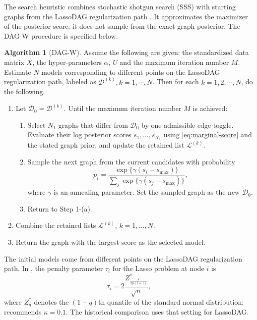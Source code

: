 \documentclass[12pt]{article}
\theoremstyle{plain}
\theoremstyle{definition}
\newtheorem{algo}[theorem]{Algorithm}
\theoremstyle{remark}
\begin{document}
The search heuristic combines stochastic shotgun search (SSS)
\cite{SSS} with starting graphs from the LassoDAG regularization path
\cite{LassoDAG}.  It approximates the maximizer of the posterior score;
it does not sample from the exact graph posterior.  The DAG-W procedure
is specified below.
\begin{algo}[DAG-W]\label{algo:DAG-W}
Assume the following are given: the standardized data matrix $X$, the hyper-parameters $\alpha$, $U$ and the maximum iteration number $M$. Estimate  $N$ models corresponding to different points on the LassoDAG regularization path, labeled as $\mathcal{D}^{(k)}, k=1, \cdots, N$. Then for each $k = 1, 2, \cdots, N$, do the following.
\begin{enumerate}
\item Let $\mathcal{D}_0 = \mathcal{D}^{(k)}$. Until the maximum iteration number $M$ is achieved:
\begin{enumerate}
\item Select $N_1$ graphs that differ from $\mathcal{D}_0$ by one
admissible edge toggle.  Evaluate their log posterior scores
$s_1,\ldots,s_{N_1}$ using \eqref{eq:marginal-score} and the stated
graph prior, and update the retained list $\mathcal{L}^{(k)}$.
\item Sample the next graph from the current candidates with probability
\[
p_i=\frac{\exp\{\gamma(s_i-s_{\max})\}}
{\sum_j\exp\{\gamma(s_j-s_{\max})\}},
\]
where $\gamma$ is an annealing parameter.  Set the sampled graph as the
new $\mathcal{D}_0$.
\item Return to Step 1-(a).
\end{enumerate}
\item Combine the retained lists \(\mathcal{L}^{(k)}\), \(k=1,\ldots,N\).
\item Return the graph with the largest score as the selected model.
\end{enumerate}
\end{algo}

The initial models come from different points on the LassoDAG
regularization path.  In \cite{LassoDAG}, the penalty parameter
\(\tau_i\) for the Lasso problem at node \(i\) is
\begin{equation}
\label{eq:eq1}
\tau_i = 2\frac{Z^*_{\frac{\kappa}{2p(i-1)}}}{\sqrt{n}},
\end{equation}
where \(Z^*_q\) denotes the \((1-q)\)th quantile of the standard normal
distribution; \cite{LassoDAG} recommends \(\kappa=0.1\).  The
historical comparison uses that setting for LassoDAG.
\end{document}
